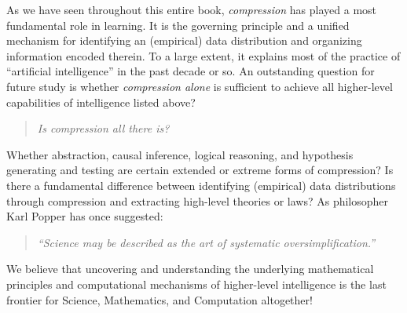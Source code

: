\documentclass[../../book-main.tex]{subfiles}
\begin{document}
As we have seen throughout this entire book, {\em compression} has played a most fundamental role in learning. It is the governing principle and a unified mechanism for identifying an (empirical) data distribution and organizing information encoded therein. To a large extent, it explains most of the practice of ``artificial intelligence'' in the past decade or so. An outstanding question for future study is whether {\em compression alone} is sufficient to achieve all higher-level capabilities of intelligence listed above? 
\begin{quote}
\begin{center}
        {\em Is compression all there is?}
\end{center}
\end{quote}
Whether abstraction, causal inference, logical reasoning, and hypothesis generating and testing are certain extended or extreme forms of compression? Is there a fundamental difference between identifying (empirical) data distributions through compression and extracting high-level theories or laws?  As philosopher Karl Popper has once suggested:
\begin{quote}
    \begin{center}
    {\em ``Science may be described as the art of systematic oversimplification.''}
    \end{center}
\end{quote}
We believe that uncovering and understanding the underlying mathematical principles and computational mechanisms of higher-level intelligence is the last frontier for Science, Mathematics, and Computation altogether!
\end{document}
